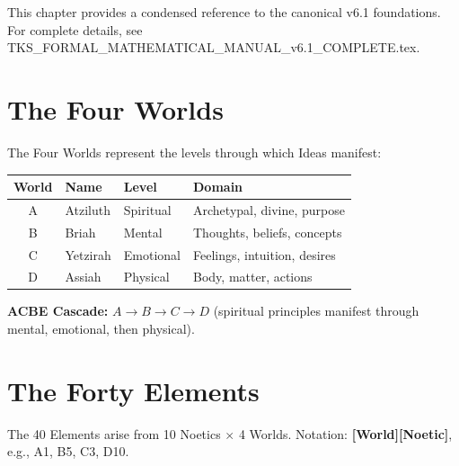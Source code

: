 \documentclass[11pt,twoside,openright]{book}
\theoremstyle{definition}
\theoremstyle{plain}
\theoremstyle{remark}
\begin{document}
\begin{tcolorbox}[colback=gray!10!white,colframe=gray!75!black,title=\textbf{Reference Chapter}]
This chapter provides a condensed reference to the canonical v6.1 foundations. For complete details, see TKS\_FORMAL\_MATHEMATICAL\_MANUAL\_v6.1\_COMPLETE.tex.
\end{tcolorbox}


\section{The Four Worlds}
\label{sec:four-worlds}

The Four Worlds represent the levels through which Ideas manifest:

\begin{center}
\begin{tabular}{clll}
\toprule
\textbf{World} & \textbf{Name} & \textbf{Level} & \textbf{Domain} \\
\midrule
A & Atziluth & Spiritual & Archetypal, divine, purpose \\
B & Briah & Mental & Thoughts, beliefs, concepts \\
C & Yetzirah & Emotional & Feelings, intuition, desires \\
D & Assiah & Physical & Body, matter, actions \\
\bottomrule
\end{tabular}
\end{center}

\textbf{ACBE Cascade:} $A \to B \to C \to D$ (spiritual principles manifest through mental, emotional, then physical).

\section{The Forty Elements}
\label{sec:forty-elements}

The 40 Elements arise from 10 Noetics $\times$ 4 Worlds. Notation: \textbf{[World][Noetic]}, e.g., A1, B5, C3, D10.
\end{document}
